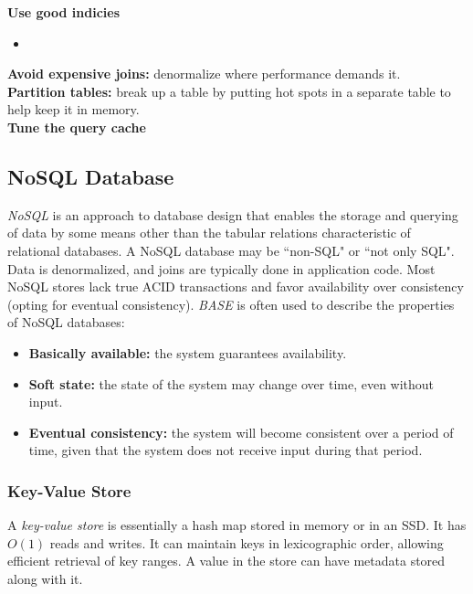 \documentclass[12pt, titlepage]{article}
\begin{document}
\textbf{Use good indicies}
\begin{itemize}
  \item 
\end{itemize}

\textbf{Avoid expensive joins:} denormalize where performance demands it. \\

\textbf{Partition tables:} break up a table by putting hot spots in a separate table to help keep it in memory. \\

\textbf{Tune the query cache} \\

\subsection{NoSQL Database}

\textit{NoSQL} is an approach to database design that enables the storage and querying of data by some means other than the tabular relations characteristic of relational databases. A NoSQL database may be ``non-SQL" or ``not only SQL". \\

Data is denormalized, and joins are typically done in application code. Most NoSQL stores lack true ACID transactions and favor availability over consistency (opting for eventual consistency). \textit{BASE} is often used to describe the properties of NoSQL databases: \\

\begin{itemize}
  \item \textbf{Basically available:} the system guarantees availability.
  \item \textbf{Soft state:} the state of the system may change over time, even without input.
  \item \textbf{Eventual consistency:} the system will become consistent over a period of time, given that the system does not receive input during that period.
\end{itemize}

\subsubsection{Key-Value Store}

A \textit{key-value store} is essentially a hash map stored in memory or in an SSD. It has $O(1)$ reads and writes. It can maintain keys in lexicographic order, allowing efficient retrieval of key ranges. A value in the store can have metadata stored along with it. \\
\end{document}
